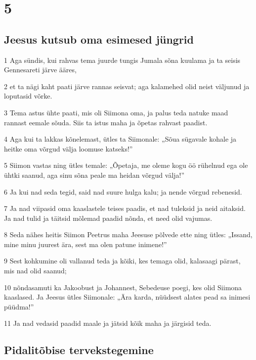 \chapter{5}

\section*{Jeesus kutsub oma esimesed jüngrid}

\par 1 Aga sündis, kui rahvas tema juurde tungis Jumala sõna kuulama ja ta seisis Gennesareti järve ääres,
\par 2 et ta nägi kaht paati järve rannas seisvat; aga kalamehed olid neist väljunud ja loputasid võrke.
\par 3 Tema astus ühte paati, mis oli Siimona oma, ja palus teda natuke maad rannast eemale sõuda. Siis ta istus maha ja õpetas rahvast paadist.
\par 4 Aga kui ta lakkas kõnelemast, ütles ta Siimonale: „Sõua sügavale kohale ja heitke oma võrgud välja loomuse katseks!”
\par 5 Siimon vastas ning ütles temale: „Õpetaja, me oleme kogu öö rühelnud ega ole ühtki saanud, aga sinu sõna peale ma heidan võrgud välja!”
\par 6 Ja kui nad seda tegid, said nad suure hulga kalu; ja nende võrgud rebenesid.
\par 7 Ja nad viipasid oma kaaslastele teises paadis, et nad tuleksid ja neid aitaksid. Ja nad tulid ja täitsid mõlemad paadid nõnda, et need olid vajumas.
\par 8 Seda nähes heitis Siimon Peetrus maha Jeesuse põlvede ette ning ütles: „Issand, mine minu juurest ära, sest ma olen patune inimene!”
\par 9 Sest kohkumine oli vallanud teda ja kõiki, kes temaga olid, kalasaagi pärast, mis nad olid saanud;
\par 10 nõndasamuti ka Jakoobust ja Johannest, Sebedeuse poegi, kes olid Siimona kaaslased. Ja Jeesus ütles Siimonale: „Ära karda, nüüdsest alates pead sa inimesi püüdma!”
\par 11 Ja nad vedasid paadid maale ja jätsid kõik maha ja järgisid teda.

\section*{Pidalitõbise tervekstegemine}


